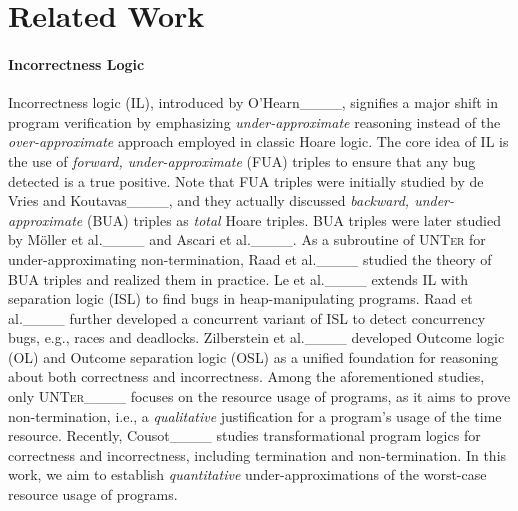 \section{Related Work}
\label{sec:related}


\paragraph*{Incorrectness Logic}
%
Incorrectness logic (IL), introduced by O'Hearn____, signifies a major shift in program verification by emphasizing \emph{under-approximate} reasoning instead of the \emph{over-approximate} approach employed in classic Hoare logic.
%
The core idea of IL is the use of \emph{forward, under-approximate} (FUA) triples to ensure that any bug detected is a true positive.
%
Note that FUA triples were initially studied by de Vries and Koutavas____, and they actually discussed \emph{backward, under-approximate} (BUA) triples as \emph{total} Hoare triples.
%
BUA triples were later studied by M{\"o}ller et al.____ and Ascari et al.____.
%
As a subroutine of \textsc{UNTer} for under-approximating non-termination, Raad et al.____ studied the theory of BUA triples and realized them in practice.
%
Le et al.____ extends IL with separation logic (ISL) to find bugs in heap-manipulating programs.
%
Raad et al.____ further developed a concurrent variant of ISL to detect concurrency bugs, e.g., races and deadlocks.
%
Zilberstein et al.____ developed Outcome logic (OL) and Outcome separation logic (OSL) as a unified foundation for reasoning about both correctness and incorrectness.
%
Among the aforementioned studies, only \textsc{UNTer}____ focuses on the resource usage of programs, as it aims to prove non-termination, i.e., a \emph{qualitative} justification for a program's usage of the time resource.
%
Recently, Cousot____ studies transformational program logics for correctness and incorrectness, including termination and non-termination.
%
In this work, we aim to establish \emph{quantitative} under-approximations of the worst-case resource usage of programs. 

